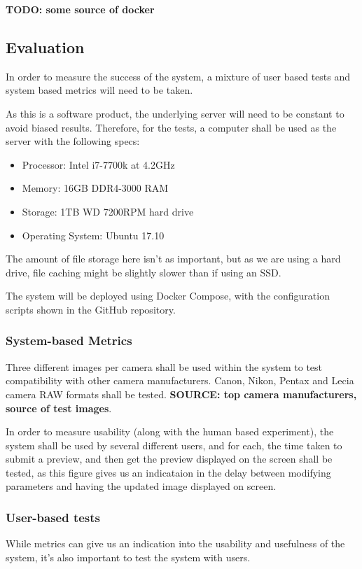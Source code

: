 \documentclass[12pt,a4paper]{article}
\begin{document}
\textbf{TODO: some source of docker}
\subsection{Evaluation}
In order to measure the success of the system, a mixture of user based tests and system
based metrics will need to be taken.

As this is a software product, the underlying server will need to be constant to avoid
biased results. Therefore, for the tests, a computer shall be used as the server with the
following specs:

\begin{itemize}
  \item Processor: Intel i7-7700k at 4.2GHz
  \item Memory: 16GB DDR4-3000 RAM
  \item Storage: 1TB WD 7200RPM hard drive
  \item Operating System: Ubuntu 17.10
\end{itemize}

The amount of file storage here isn't as important, but as we are using a hard drive,
file caching might be slightly slower than if using an SSD.

The system will be deployed using Docker Compose, with the configuration scripts shown in the GitHub
repository.

\subsubsection{System-based Metrics}
Three different images per camera shall be used within the system to test compatibility
with other camera manufacturers. Canon, Nikon, Pentax and Lecia camera RAW formats shall be tested.
\textbf{SOURCE: top camera manufacturers, source of test images}.

In order to measure usability (along with the human based experiment), the system shall be used by
several different users, and for each, the time taken to submit a preview, and then get the preview displayed
on the screen shall be tested, as this figure gives us an indicataion in the delay between modifying parameters
and having the updated image displayed on screen.

\subsubsection{User-based tests}
While metrics can give us an indication into the usability and usefulness of the system,
it's also important to test the system with users.
\end{document}
